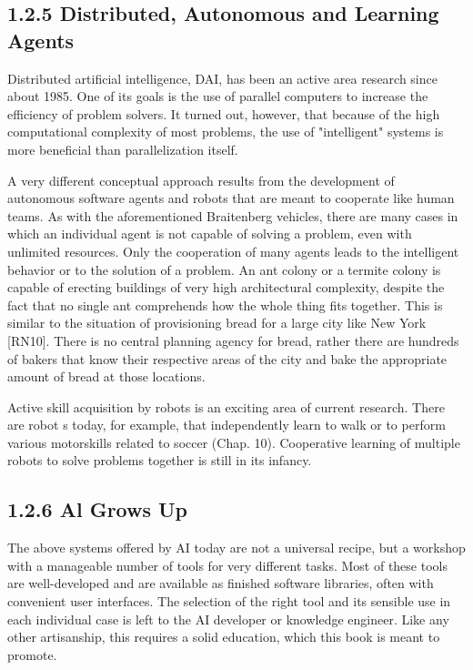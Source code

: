 \documentclass[10pt]{article}
\begin{document}
\subsection*{1.2.5 Distributed, Autonomous and Learning Agents}
Distributed artificial intelligence, DAI, has been an active area research since about 1985. One of its goals is the use of parallel computers to increase the efficiency of problem solvers. It turned out, however, that because of the high computational complexity of most problems, the use of "intelligent" systems is more beneficial than parallelization itself.

A very different conceptual approach results from the development of autonomous software agents and robots that are meant to cooperate like human teams. As with the aforementioned Braitenberg vehicles, there are many cases in which an individual agent is not capable of solving a problem, even with unlimited resources. Only the cooperation of many agents leads to the intelligent behavior or to the solution of a problem. An ant colony or a termite colony is capable of erecting buildings of very high architectural complexity, despite the fact that no single ant comprehends how the whole thing fits together. This is similar to the situation of provisioning bread for a large city like New York [RN10]. There is no central planning agency for bread, rather there are hundreds of bakers that know their respective areas of the city and bake the appropriate amount of bread at those locations.

Active skill acquisition by robots is an exciting area of current research. There are robot
s today, for example, that independently learn to walk or to perform\\
various motorskills related to soccer (Chap. 10). Cooperative learning of multiple robots to solve problems together is still in its infancy.

\subsection*{1.2.6 Al Grows Up}
The above systems offered by AI today are not a universal recipe, but a workshop with a manageable number of tools for very different tasks. Most of these tools are well-developed and are available as finished software libraries, often with convenient user interfaces. The selection of the right tool and its sensible use in each individual case is left to the AI developer or knowledge engineer. Like any other artisanship, this requires a solid education, which this book is meant to promote.
\end{document}
